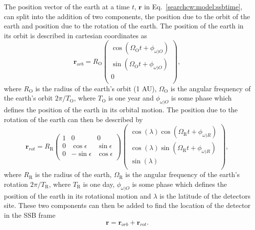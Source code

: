 The position vector of the earth at a time $t$, $\bm{r}$ in Eq.~\ref{searchcw:model:ssbtime}, can split into the addition of two components, the position due to the orbit of the earth and position due to the rotation of the earth.
The position of the earth in its orbit is described in cartesian coordinates as
\begin{equation}
    \bm{r}_{orb} = R_{\mathrm{O}}
    \left(
    \begin{matrix}
        \cos{\left( \Omega_{\mathrm{O}} t + \phi_{\omega){O}}  \right)}  \\
        \sin{\left( \Omega_{\mathrm{O}} t + \phi_{\omega){O}}  \right)} \\
        0 \\
    \end{matrix} \right),
\end{equation}
where $R_{\mathrm{O}}$ is the radius of the earth's orbit (1 AU), $\Omega_{\mathrm{O}}$ is the angular frequency of the earth's orbit $2\pi/T_{\mathrm{O}}$, where $T_{\mathrm{O}}$ is one year and $\phi_{\omega){O}}$ is some phase which defines the position of the earth in its orbital motion.
The position due to the rotation of the earth can then be described by 
\begin{equation}
    \bm{r}_{rot} = R_{\mathrm{R}}
    \left(
    \begin{matrix}
        1 & 0 & 0  \\
        0 & \cos \epsilon & \sin \epsilon \\
        0 & -\sin \epsilon & \cos \epsilon \\
    \end{matrix} \right)
    \left(
    \begin{matrix}
        \cos{(\lambda)}\cos{\left( \Omega_{\mathrm{R}} t + \phi_{\omega){R}}  \right)}  \\
        \cos{(\lambda)}\sin{\left( \Omega_{\mathrm{R}} t + \phi_{\omega){R}}  \right)} \\
        \sin{(\lambda)} \\
    \end{matrix} \right),
\end{equation}
where $R_{\mathrm{R}}$ is the radius of the earth, $\Omega_{\mathrm{R}}$ is the angular frequency of the earth's rotation $2\pi/T_{\mathrm{R}}$, where $T_{\mathrm{R}}$ is one day, $\phi_{\omega){O}}$ is some phase which defines the position of the earth in its rotational motion and $\lambda$ is the latitude of the detectors site.
These two components can then be added to find the location of the detector in the \gls{SSB} frame
\begin{equation}
    \bm{r} = \bm{r}_{orb} + \bm{r}_{rot}.
\end{equation}

